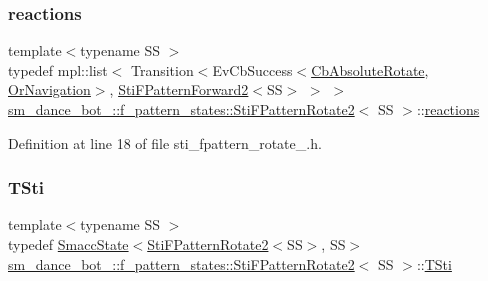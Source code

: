 \subsubsection{\texorpdfstring{reactions}{reactions}}
{\footnotesize\ttfamily template$<$typename SS $>$ \\
typedef mpl\+::list$<$ Transition$<$Ev\+Cb\+Success$<$\hyperlink{classcl__move__base__z_1_1CbAbsoluteRotate}{Cb\+Absolute\+Rotate}, \hyperlink{classsm__dance__bot__2_1_1OrNavigation}{Or\+Navigation}$>$, \hyperlink{classsm__dance__bot__2_1_1f__pattern__states_1_1StiFPatternForward2}{Sti\+F\+Pattern\+Forward2}$<$SS$>$ $>$ $>$ \hyperlink{classsm__dance__bot__2_1_1f__pattern__states_1_1StiFPatternRotate2}{sm\+\_\+dance\+\_\+bot\+\_\+::f\+\_\+pattern\+\_\+states\+::\+Sti\+F\+Pattern\+Rotate2}$<$ SS $>$\+::\hyperlink{classsm__dance__bot__2_1_1f__pattern__states_1_1StiFPatternRotate2_abb26d0191d8a0a5bb83359bee5e9ca72}{reactions}}



Definition at line 18 of file sti\+\_\+fpattern\+\_\+rotate\+\_.\+h.

\mbox{\label{classsm__dance__bot__2_1_1f__pattern__states_1_1StiFPatternRotate2_a0a9f46d2a651a04d9e75fea30ad4d32b}} 
\subsubsection{\texorpdfstring{T\+Sti}{TSti}}
{\footnotesize\ttfamily template$<$typename SS $>$ \\
typedef \hyperlink{classSmaccState}{Smacc\+State}$<$\hyperlink{classsm__dance__bot__2_1_1f__pattern__states_1_1StiFPatternRotate2}{Sti\+F\+Pattern\+Rotate2}$<$SS$>$, SS$>$ \hyperlink{classsm__dance__bot__2_1_1f__pattern__states_1_1StiFPatternRotate2}{sm\+\_\+dance\+\_\+bot\+\_\+::f\+\_\+pattern\+\_\+states\+::\+Sti\+F\+Pattern\+Rotate2}$<$ SS $>$\+::\hyperlink{classsm__dance__bot__2_1_1f__pattern__states_1_1StiFPatternRotate2_a0a9f46d2a651a04d9e75fea30ad4d32b}{T\+Sti}}



